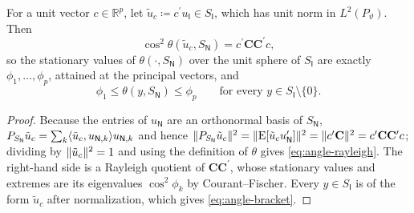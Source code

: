 \documentclass{IEEEtran}
\begin{document}
\begin{proposition}
  \label{prop:principal-variational}
  For a unit vector $c \in \mathbb{R}^{p}$, let $\tilde{u}_{c} \coloneq c^{\prime}u_{\mathsf{I}} \in S_{\mathsf{I}}$, which has unit norm in $L^{2}(P_{\vartheta})$. Then
  \begin{equation}
    \cos^{2}\theta(\tilde{u}_{c}, S_{\mathsf{N}}) = c^{\prime}\mathbf{C}\mathbf{C}^{\prime}c ,
    \label{eq:angle-rayleigh}
  \end{equation}
  so the stationary values of $\theta(\cdot, S_{\mathsf{N}})$ over the unit sphere of $S_{\mathsf{I}}$ are exactly $\phi_{1},\ldots,\phi_{p}$, attained at the principal vectors, and
  \begin{equation}
    \phi_{1} \le \theta(y, S_{\mathsf{N}}) \le \phi_{p}
    \qquad \text{for every } y \in S_{\mathsf{I}} \setminus \{0\} .
    \label{eq:angle-bracket}
  \end{equation}
\end{proposition}

\begin{proof}
  Because the entries of $u_{\mathsf{N}}$ are an orthonormal basis of $S_{\mathsf{N}}$, $P_{S_{\mathsf{N}}}\tilde{u}_{c} = \sum_{k}\langle\tilde{u}_{c}, u_{\mathsf{N},k}\rangle u_{\mathsf{N},k}$ and hence $\lVert P_{S_{\mathsf{N}}}\tilde{u}_{c}\rVert^{2} = \lVert\operatorname{E}[\tilde{u}_{c}u_{\mathsf{N}}^{\prime}]\rVert^{2} = \lVert c^{\prime}\mathbf{C}\rVert^{2} = c^{\prime}\mathbf{C}\mathbf{C}^{\prime}c$; dividing by $\lVert\tilde{u}_{c}\rVert^{2}=1$ and using the definition of $\theta$ gives \eqref{eq:angle-rayleigh}. The right-hand side is a Rayleigh quotient of $\mathbf{C}\mathbf{C}^{\prime}$, whose stationary values and extremes are its eigenvalues $\cos^{2}\phi_{k}$ by Courant--Fischer. Every $y \in S_{\mathsf{I}}$ is of the form $\tilde{u}_{c}$ after normalization, which gives \eqref{eq:angle-bracket}.
\end{proof}
\end{document}
